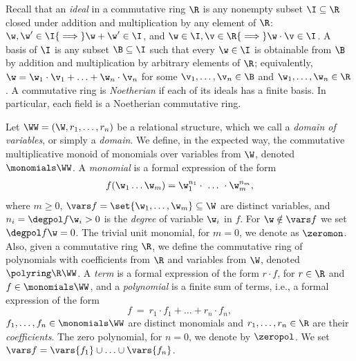

Recall that an \emph{ideal} in a commutative ring $\R$ is any nonempty subset $\I\subseteq\R$ 
closed under addition and multiplication by any element of $\R$: $\w, \w' \in \I {\implies} \w+\w'\in\I$,
and $\w\in\I, \v\in\R{\implies}\w\cdot\v\in\I$.
A basis of $\I$ is any subset $\B\subseteq\I$ such that every $\w\in\I$ is obtainable from $\B$
by addition and multiplication by arbitrary elements of $\R$;
equivalently, $\w= \w_1 \cdot \v_1 + \ldots + \w_n \cdot \v_n$ for some $\v_1,\ldots, \v_n\in\B$ and
$\w_1, \ldots, \w_n\in\R$.
A commutative ring is \emph{Noetherian} if each of its ideals has a finite basis.
%
In particular, each field is a Noetherian commutative ring.


Let $\WW = (\W, r_1,\ldots, r_n)$ be a relational structure,
which we call a \emph{domain of variables}, or simply a \emph{domain}.
We define, in the expected way,
the commutative multiplicative monoid of monomials over variables from $\W$, 
denoted $\monomials \WW$. %
%
A \emph{monomial} is a formal expression of the form
\begin{align*} %
f(\w_1 \ldots \w_m) = \w_1^{n_1} \cdot  \ \ldots \  \cdot  \w_m^{n_m},
\end{align*}
%
where $m\geq 0$, $\vars f = \set{\w_1, \ldots, \w_m} \subseteq \W$ are distinct variables, 
and $n_i = \degpol f {\w_i}>0$ is the \emph{degree} of variable $\w_i$ in $f$.
For $\w \notin\vars f$ we set $\degpol f \w = 0$.
The trivial unit monomial, for $m=0$, we denote as $\zeromon$.
Also, given a commutative ring $\R$,
we define the commutative ring of polynomials with coefficients from $\R$ and variables from $\W$, 
denoted $\polyring \R \WW$.
A \emph{term} is a formal expression of the form $r\cdot f$, for $r\in\R$ and $f\in\monomials \WW$,
and a \emph{polynomial} is a finite sum of terms, i.e., a formal expression of the form
\[
f \ = \ r_1 \cdot f_1 + \ldots + r_n \cdot f_n,
\]
$f_1, \ldots, f_n\in\monomials \WW$ are distinct monomials and
$r_1, \ldots, r_n\in\R$ are their \emph{coefficients}.
The zero polynomial, for $n=0$, we denote by $\zeropol$.
We set $\vars f = \vars {f_1} \cup \ldots \cup \vars {f_n}$.



